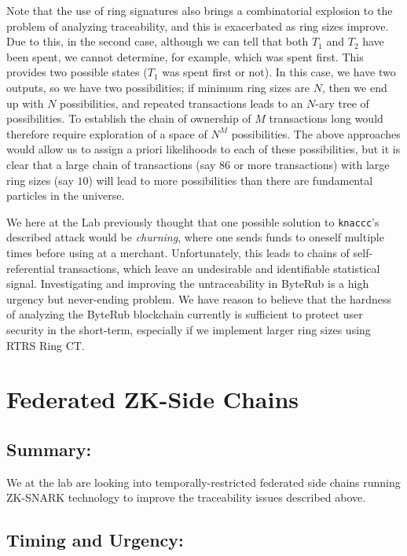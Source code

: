 \documentclass[12pt,english]{mrl}
\theoremstyle{definition}
\numberwithin{equation}{section}
\numberwithin{figure}{section}
\numberwithin{equation}{section}
\numberwithin{equation}{section}
\numberwithin{figure}{section}
\begin{document}
Note that the use of ring signatures also brings a combinatorial explosion to the problem of analyzing traceability, and this is exacerbated as ring sizes improve. Due to this, in the second case, although we can tell that both $T_1$ and $T_2$ have been spent, we cannot determine, for example, which was spent first. This provides two possible states ($T_1$ was spent first or not). In this case, we have two outputs, so we have two possibilities; if minimum ring sizes are $N$, then we end up with $N$ possibilities, and repeated transactions leads to an $N$-ary tree of possibilities. To establish the chain of ownership of $M$ transactions long would therefore require exploration of a space of $N^M$ possibilities. The above approaches would allow us to assign a priori likelihoods to each of these possibilities, but it is clear that a large chain of transactions (say $86$ or more transactions) with large ring sizes (say $10$) will lead to more possibilities than there are fundamental particles in the universe.

We here at the Lab previously thought that one possible solution to \texttt{knaccc}'s described attack would be \textit{churning}, where one sends funds to oneself multiple times before using at a merchant. Unfortunately, this leads to chains of self-referential transactions, which leave an undesirable and identifiable statistical signal.  Investigating and improving the untraceability in ByteRub is a high urgency but never-ending problem. We have reason to believe that the hardness of analyzing the ByteRub blockchain currently is sufficient to protect user security in the short-term, especially if we implement larger ring sizes using RTRS Ring CT.




\section{Federated ZK-Side Chains}


\subsection{Summary:} 

We at the lab are looking into temporally-restricted federated side chains running ZK-SNARK technology to improve the traceability issues described above. 

\subsection{Timing and Urgency:} 
\end{document}
